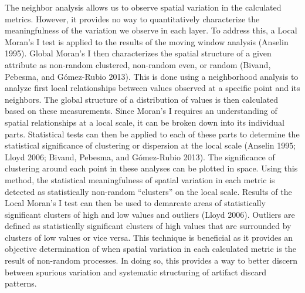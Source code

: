 \documentclass[smallextended]{svjour3}       %
\begin{document}
The neighbor analysis allows us to observe spatial variation in the
calculated metrics. However, it provides no way to quantitatively
characterize the meaningfulness of the variation we observe in each
layer. To address this, a Local Moran's I test is applied to the results
of the moving window analysis (Anselin 1995). Global Moran's I then
characterizes the spatial structure of a given attribute as non-random
clustered, non-random even, or random (Bivand, Pebesma, and Gómez-Rubio
2013). This is done using a neighborhood analysis to analyze first local
relationships between values observed at a specific point and its
neighbors. The global structure of a distribution of values is then
calculated based on these measurements. Since Moran's I requires an
understanding of spatial relationships at a local scale, it can be
broken down into its individual parts. Statistical tests can then be
applied to each of these parts to determine the statistical significance
of clustering or dispersion at the local scale (Anselin 1995; Lloyd
2006; Bivand, Pebesma, and Gómez-Rubio 2013). The significance of
clustering around each point in these analyses can be plotted in space.
Using this method, the statistical meaningfulness of spatial variation
in each metric is detected as statistically non-random ``clusters'' on
the local scale. Results of the Local Moran's I test can then be used to
demarcate areas of statistically significant clusters of high and low
values and outliers (Lloyd 2006). Outliers are defined as statistically
significant clusters of high values that are surrounded by clusters of
low values or vice versa. This technique is beneficial as it provides an
objective determination of when spatial variation in each calculated
metric is the result of non-random processes. In doing so, this provides
a way to better discern between spurious variation and systematic
structuring of artifact discard patterns.
\end{document}
